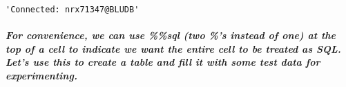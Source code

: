 \documentclass[11pt]{article}
\makeatletter
\newcommand{\boxspacing}{\kern\kvtcb@left@rule\kern\kvtcb@boxsep}
\newcommand{\prompt}[4]{
        \ttfamily\llap{{\color{#2}[#3]:\hspace{3pt}#4}}\vspace{-\baselineskip}
    }
\makeatother
\begin{document}
            \begin{tcolorbox}[breakable, size=fbox, boxrule=.5pt, pad at break*=1mm, opacityfill=0]
\prompt{Out}{outcolor}{2}{\boxspacing}
\begin{Verbatim}[commandchars=\\\{\}]
'Connected: nrx71347@BLUDB'
\end{Verbatim}
\end{tcolorbox}
        
    \hypertarget{for-convenience-we-can-use-sql-two-s-instead-of-one-at-the-top-of-a-cell-to-indicate-we-want-the-entire-cell-to-be-treated-as-sql.-lets-use-this-to-create-a-table-and-fill-it-with-some-test-data-for-experimenting.}{%
\subparagraph{For convenience, we can use \%\%sql (two \%'s instead of
one) at the top of a cell to indicate we want the entire cell to be
treated as SQL. Let's use this to create a table and fill it with some
test data for
experimenting.}\label{for-convenience-we-can-use-sql-two-s-instead-of-one-at-the-top-of-a-cell-to-indicate-we-want-the-entire-cell-to-be-treated-as-sql.-lets-use-this-to-create-a-table-and-fill-it-with-some-test-data-for-experimenting.}}
\end{document}
